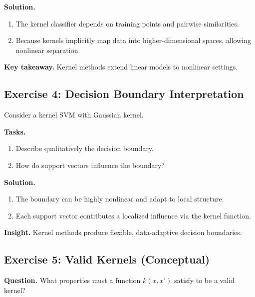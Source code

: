 \medskip

\noindent
\textbf{Solution.}

\begin{enumerate}
\item The kernel classifier depends on training points and pairwise similarities.

\item Because kernels implicitly map data into higher-dimensional spaces, allowing nonlinear separation.
\end{enumerate}

\medskip

\noindent
\textbf{Key takeaway.}  
Kernel methods extend linear models to nonlinear settings.

\subsection{Exercise 4: Decision Boundary Interpretation}

Consider a kernel SVM with Gaussian kernel.

\medskip

\noindent
\textbf{Tasks.}
\begin{enumerate}
    \item Describe qualitatively the decision boundary.
    \item How do support vectors influence the boundary?
\end{enumerate}

\medskip

\noindent
\textbf{Solution.}

\begin{enumerate}
\item The boundary can be highly nonlinear and adapt to local structure.

\item Each support vector contributes a localized influence via the kernel function.
\end{enumerate}

\medskip

\noindent
\textbf{Insight.}  
Kernel methods produce flexible, data-adaptive decision boundaries.

\subsection{Exercise 5: Valid Kernels (Conceptual)}

\textbf{Question.}  
What properties must a function $k(x,x')$ satisfy to be a valid kernel?


